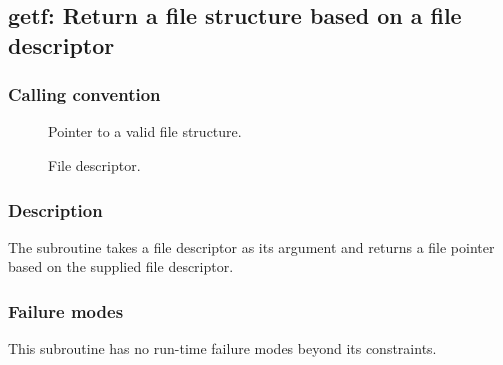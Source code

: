 \clearpage
{}
{}
\label{subr:getf}
\subsection*{getf: Return a file structure based on a file descriptor}

\subsubsection*{Calling convention}

\begin{description}
\item[] Pointer to a valid file structure.
\item[] File descriptor.
\end{description}

\subsubsection*{Description}

The  subroutine takes a file descriptor as its
argument and returns a file pointer based on the supplied file
descriptor.

\subsubsection*{Failure modes}

This subroutine has no run-time failure modes beyond its constraints.
